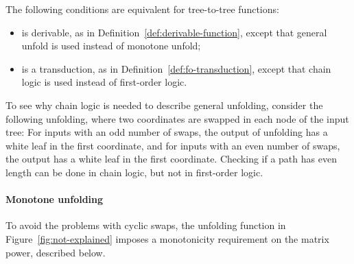 \begin{theorem}\label{thm:chain-transductions}
    The following conditions are equivalent for tree-to-tree functions:
\begin{itemize}
    \item is derivable, as in Definition~\ref{def:derivable-function}, except that general unfold is used instead of monotone unfold;
    \item is a transduction,  as in  Definition~\ref{def:fo-transduction},  except that chain logic is used instead of first-order logic. 
\end{itemize}
\end{theorem}




 To see why chain logic is needed to describe general unfolding, consider the following unfolding, where two coordinates are swapped in each node of the input tree:
For inputs with an odd number of swaps, the output of unfolding has a white leaf in the first coordinate, and for inputs with an even number of swaps, the output has a white leaf in the first coordinate.  Checking if a path has even length can be done in chain logic, but not in  first-order logic.  

\paragraph*{Monotone unfolding}
To avoid the problems with cyclic swaps, the unfolding function in Figure~\ref{fig:not-explained} imposes a monotonicity requirement on the matrix power, described below.


